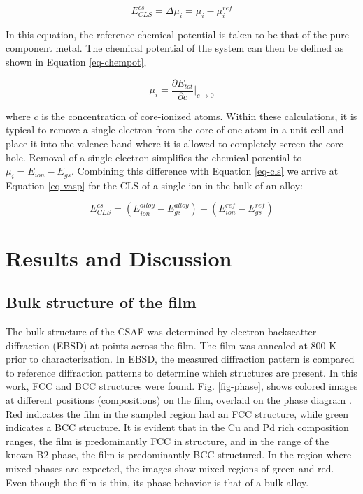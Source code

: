 \documentclass[number, sort&compress, review, 12pt]{elsarticle}
\begin{document}
\begin{equation}
E^{cs}_{CLS} = \Delta \mu_{i} = \mu_{i} - \mu^{ref}_{i} \label{eq-cls}
\end{equation}

\noindent In this equation, the reference chemical potential is taken to be that of the pure component metal. The chemical potential of the system can then be defined as shown in Equation \ref{eq-chempot},

\begin{equation}
\mu_{i} = \frac{\partial E_{tot}}{\partial c}\biggr|_{c \rightarrow 0}  \label{eq-chempot}
\end{equation}

\noindent where \(c\) is the concentration of core-ionized atoms. Within these calculations, it is typical to remove a single electron from the core of one atom in a unit cell and place it into the valence band where it is allowed to completely screen the core-hole. Removal of a single electron simplifies the chemical potential to \(\mu_{i} = E_{ion} - E_{gs}\). Combining this difference with Equation \ref{eq-cls} we arrive at Equation \ref{eq-vasp} for the CLS of a single ion in the bulk of an alloy:

\begin{equation}
E^{cs}_{CLS}  = \left(E^{alloy}_{ion} - E^{alloy}_{gs}\right) - \left(E^{ref}_{ion} - E^{ref}_{gs}\right)  \label{eq-vasp}
\end{equation}

\section{Results and Discussion}
\label{sec-3}
\subsection{Bulk structure of the film}
\label{sec-3-1}
The bulk structure of the CSAF was determined by electron backscatter diffraction (EBSD) at points across the film. The film was annealed at 800 K prior to characterization. In EBSD, the measured diffraction pattern is compared to reference diffraction patterns to determine which structures are present. In this work, FCC and BCC structures were found. Fig. \ref{fig-phase}, shows colored images at different positions (compositions) on the film, overlaid on the phase diagram \cite{priyadarshini-2011-high-throug}. Red indicates the film in the sampled region had an FCC structure, while green indicates a BCC structure. It is evident that in the Cu and Pd rich composition ranges, the film is predominantly FCC in structure, and in the range of the known B2 phase, the film is predominantly BCC structured. In the region where mixed phases are expected, the images show mixed regions of green and red. Even though the film is thin, its phase behavior is that of a bulk alloy.
\end{document}
